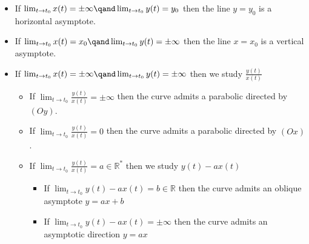 \documentclass[a4paper,12pt]{article}
\begin{document}
\begin{itemize}
	\item If $\lim_{t \to t_0} x(t)= \pm \infty \qand \lim_{t \to t_0}y(t)=y_0$ then the line $y=y_0$ is a horizontal asymptote.
	\item If $\lim_{t \to t_0} x(t)= x_0 \qand \lim_{t \to t_0}y(t)=\pm \infty$ then the line $x=x_0$ is a vertical asymptote.
	\item If $\lim_{t \to t_0} x(t)= \pm \infty \qand \lim_{t \to t_0}y(t)=\pm \infty$ then we study $\frac{y(t)}{x(t)}$
	      \begin{itemize}
		      \item If $\lim_{t \to t_0}  \frac{y(t)}{x(t)}=\pm \infty$ then the curve admits a parabolic directed by $(Oy)$.
		      \item If $\lim_{t \to t_0}  \frac{y(t)}{x(t)}=0$ then the curve admits a parabolic directed by $(Ox)$.
		      \item If $\lim_{t \to t_0}  \frac{y(t)}{x(t)}=a\in \mathbb{R}^*$ then we study $y(t)-ax(t)$
		            \begin{itemize}
			            \item If $\lim_{t \to t_0} y(t)-ax(t)=b\in \mathbb{R} $ then the curve admits an oblique asymptote $y=ax+b$
			            \item If $\lim_{t \to t_0} y(t)-ax(t)=\pm \infty$ then the curve admits an asymptotic direction $y=ax$
		            \end{itemize}
	      \end{itemize}
\end{itemize}
\end{document}
